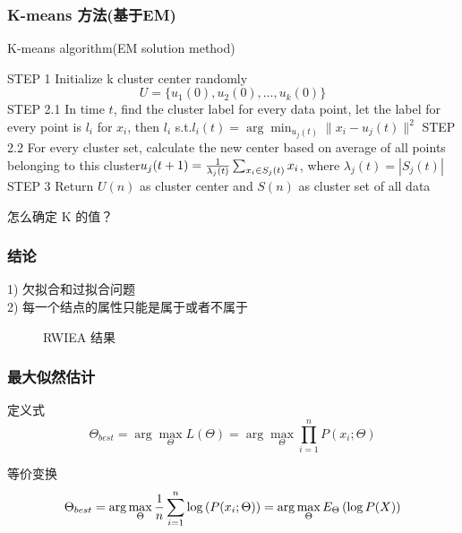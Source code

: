 \documentclass[notheorems, UTF8]{ctexbeamer}
\begin{document}
\begin{frame}
\frametitle{K-means 方法(基于EM)}
\begin{algorithm}[H]
\caption{K-means algorithm(EM solution method)}
\begin{algorithmic}
\State STEP 1 Initialize k cluster center randomly
\begin{displaymath}
U = \{u_1(0), u_2(0), \ldots, u_k(0)\}
\end{displaymath}
	\State STEP 2.1 In time $t$, find the cluster label for every data point, let the label for every point is $l_i$ for $x_i$, then $l_i$ s.t.$l_i(t) = \arg\min_{u_j(t)} \|x_i - u_j(t)\|^2$
	\State STEP 2.2 For every cluster set, calculate the new center based on average of all points belonging to this cluster$u_j(t + 1) = {1\over \lambda_j(t)}\sum_{x_i \in S_j(t)} x_i$, where $\lambda_j(t) = |S_j(t)|$
\EndWhile
\State STEP 3 Return $U(n)$ as cluster center and $S(n)$ as cluster set of all data
\end{algorithmic}
\end{algorithm}
\begin{center}
怎么确定 K 的值？
\end{center}
\end{frame}





\begin{frame}
\frametitle{结论}
1) 欠拟合和过拟合问题\\
2) 每一个结点的属性只能是属于或者不属于\\
\begin{figure}[H]
\centering
{}
\caption{RWIEA 结果} \label{fig:1}
\end{figure}
\end{frame}



\begin{frame}
\frametitle{最大似然估计}
定义式
\begin{displaymath}
\Theta_{best} = \arg \max_{\Theta} L(\Theta) = \arg \max_{\Theta} \prod_{i = 1}^{n} P(x_i; \Theta)
\end{displaymath}

等价变换
\begin{displaymath}
\Theta_{best} = \arg \max_{\Theta} {1 \over n} \sum_{i = 1}^{n} \log\left(  P(x_i; \Theta)\right) = \arg \max_{\Theta} E_{\Theta} \left( \log P(X)\right)
\end{displaymath}
\end{frame}
\end{document}
